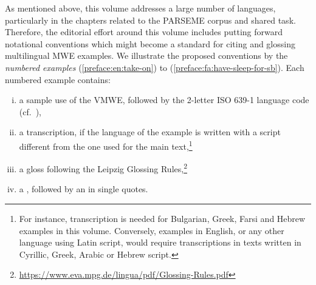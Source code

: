\documentclass[output=paper,modfonts,]{langscibook}
\begin{document}
 As mentioned above, this volume addresses a large number of languages, particularly in the chapters related to the PARSEME corpus and shared task. Therefore, the editorial effort around this volume includes putting forward notational conventions which might become a standard for citing and glossing multilingual MWE examples.
We illustrate the proposed conventions by the \emph{numbered examples}  (\ref{preface:en:take-on}) to (\ref{preface:fa:have-sleep-for-sb}). Each numbered example contains:%
\begin{enumerate}[(i)]%
\item\label{ex-line:use} a sample use of the VMWE, followed by the 2-letter ISO 639-1 language code (cf.~),

\item\label{ex-line:transcription} a transcription, if the language of the example is written with a script different from the one used for the main text,\footnote{For instance, transcription is needed for Bulgarian, Greek, Farsi and Hebrew examples in this volume. Conversely, examples in English, or any other language using Latin script, would require transcriptions %
in texts written in Cyrillic, Greek, Arabic or Hebrew script.}


\item\label{ex-line:gloss} a gloss %
following 
the Leipzig Glossing Rules,\footnote{\url{https://www.eva.mpg.de/lingua/pdf/Glossing-Rules.pdf}} 

\item\label{ex-line:trans} a , followed by an  in single quotes. 
\end{enumerate}
\end{document}
